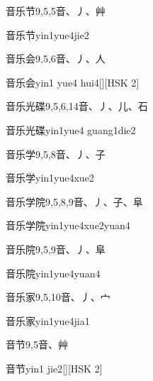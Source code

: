 \begin{Entry}{音乐节}{9,5,5}{⾳、⼃、⾋}
  \begin{Phonetics}{音乐节}{yin1yue4jie2}
  \end{Phonetics}
\end{Entry}

\begin{Entry}{音乐会}{9,5,6}{⾳、⼃、⼈}
  \begin{Phonetics}{音乐会}{yin1 yue4 hui4}[][HSK 2]
  \end{Phonetics}
\end{Entry}

\begin{Entry}{音乐光碟}{9,5,6,14}{⾳、⼃、⼉、⽯}
  \begin{Phonetics}{音乐光碟}{yin1yue4 guang1die2}
  \end{Phonetics}
\end{Entry}

\begin{Entry}{音乐学}{9,5,8}{⾳、⼃、⼦}
  \begin{Phonetics}{音乐学}{yin1yue4xue2}
  \end{Phonetics}
\end{Entry}

\begin{Entry}{音乐学院}{9,5,8,9}{⾳、⼃、⼦、⾩}
  \begin{Phonetics}{音乐学院}{yin1yue4xue2yuan4}
  \end{Phonetics}
\end{Entry}

\begin{Entry}{音乐院}{9,5,9}{⾳、⼃、⾩}
  \begin{Phonetics}{音乐院}{yin1yue4yuan4}
  \end{Phonetics}
\end{Entry}

\begin{Entry}{音乐家}{9,5,10}{⾳、⼃、⼧}
  \begin{Phonetics}{音乐家}{yin1yue4jia1}
  \end{Phonetics}
\end{Entry}

\begin{Entry}{音节}{9,5}{⾳、⾋}
  \begin{Phonetics}{音节}{yin1 jie2}[][HSK 2]
  \end{Phonetics}
\end{Entry}

